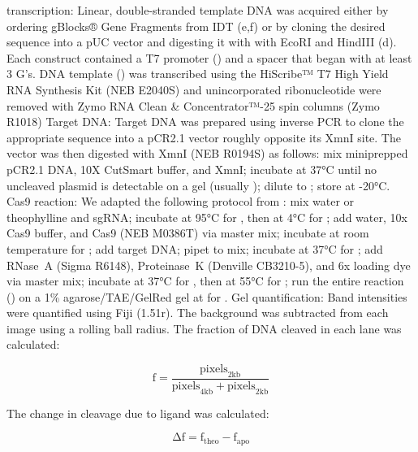 \documentclass[10pt,oneside]{article}
\begin{document}
\Invitro{} transcription: Linear, double-stranded template DNA was acquired either by ordering gBlocks® Gene Fragments from IDT (e,f) or by cloning the desired sequence into a pUC vector and digesting it with with EcoRI and HindIII (d).  Each construct contained a T7 promoter () and a spacer that began with at least 3 G's.  DNA template () was transcribed using the HiScribe™ T7 High Yield RNA Synthesis Kit (NEB E2040S) and unincorporated ribonucleotide were removed with Zymo RNA Clean \& Con\-cen\-trator™-25 spin columns (Zymo R1018) Target DNA: Target DNA was prepared using inverse PCR to clone the appropriate sequence into a pCR2.1 vector roughly opposite its XmnI site.  The vector was then digested with XmnI (NEB R0194S) as follows: mix   miniprepped pCR2.1 DNA,  10X CutSmart buffer, and   XmnI; incubate at 37°C until no uncleaved plasmid is detectable on a gel (usually ); dilute to ; store at -20°C.  Cas9 reaction: We adapted the following protocol from : mix  water or  theophylline and   sgRNA; incubate at 95°C for , then at 4°C for ; add  water,  10x Cas9 buffer, and   Cas9 (NEB M0386T) via master mix; incubate at room temperature for ; add   target DNA; pipet to mix; incubate at 37°C for ; add   RNase~A (Sigma R6148),   Proteinase~K (Denville CB3210-5), and  6x loading dye via master mix; incubate at 37°C for , then at 55°C for ; run the entire reaction () on a 1\% agarose/TAE/GelRed gel at  for .  Gel quantification: Band intensities were quantified using Fiji (1.51r).  The background was subtracted from each image using a  rolling ball radius.  The fraction of DNA cleaved in each lane was calculated:

\begin{displaymath}
 \mathrm{f} = \frac{\mathrm{pixels}_\mathrm{2kb}}{\mathrm{pixels}_\mathrm{4kb} + \mathrm{pixels}_\mathrm{2kb}}
\end{displaymath}

The change in cleavage due to ligand was calculated: 

\begin{displaymath}
 \mathrm{Δf} = \mathrm{f}_\mathrm{theo} - \mathrm{f}_\mathrm{apo}
\end{displaymath}
\end{document}
